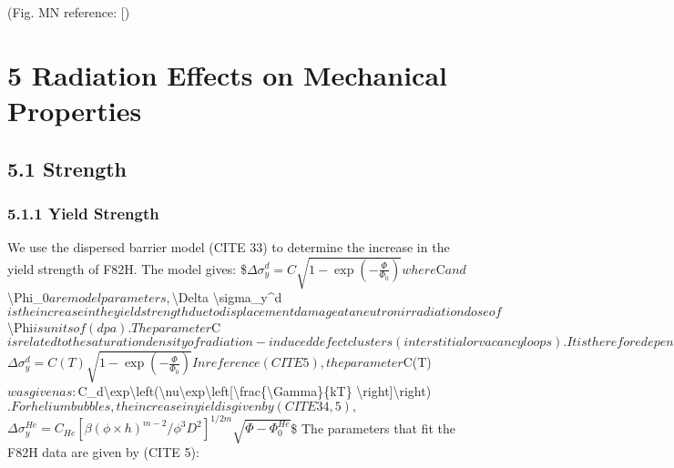 \documentclass[letterpaper,10pt,english]{jupyterBook}
\begin{document}
	\sphinxAtStartPar
	(Fig. M\sphinxhyphen{}N reference: {[}\sphinxhref{https://drive.google.com/file/d/17PwGHGcGPXCPxsERCxuVjBaVhB5xs8ud/view?usp=drive\_link}{Ando2009}{]})
	
	\sphinxstepscope
	
	
	\chapter{5 Radiation Effects on Mechanical Properties}
	\label{\detokenize{5 Radiation Effects on Mechanical Properties:radiation-effects-on-mechanical-properties}}\label{\detokenize{5 Radiation Effects on Mechanical Properties::doc}}
	
	\section{5.1 Strength}
	\label{\detokenize{5 Radiation Effects on Mechanical Properties:strength}}
	
	\subsection{5.1.1 Yield Strength}
	\label{\detokenize{5 Radiation Effects on Mechanical Properties:yield-strength}}
	\sphinxAtStartPar
	We use the dispersed barrier model (CITE 33) to determine the increase in the yield strength of F82H. The model gives:
	\$\( \Delta\sigma_y^d=C\sqrt{1-\exp(-\frac{\Phi}{\Phi_0})} \)\(
	where \)C\( and \)\textbackslash{}Phi\_0\( are model parameters, \)\textbackslash{}Delta \textbackslash{}sigma\_y\textasciicircum{}d\( is the increase in the yield strength due to displacement damage at a neutron irradiation dose of \)\textbackslash{}Phi\( is units of (dpa). The parameter \)C\( is related to the saturation density of radiation-induced defect clusters (interstitial or vacancy loops). It is therefore dependent on the temperature through the temperature dependence of the defect density.  Thus, a temperature-dependent version of the Makin-Minter model is:
	\)\( \Delta\sigma_y^d=C(T)\sqrt{1-\exp(-\frac{\Phi}{\Phi_0})} \)\(
	In reference (CITE 5), the parameter \)C(T)\( was given as: \)C\_d\textbackslash{}exp\textbackslash{}left(\sphinxhyphen{}\textbackslash{}nu\textbackslash{}exp\textbackslash{}left{[}\sphinxhyphen{}\textbackslash{}frac\{\textbackslash{}Gamma\}\{kT\} \textbackslash{}right{]}\textbackslash{}right)\(. For helium bubbles, the increase in yield is given by (CITE 34, 5),
	\)\( \Delta \sigma_y^{He}=C_{He}\left[\beta(\phi\times h)^{m-2}/\phi^3D^2\right]^{1/2m}\sqrt{\Phi-\Phi_0^{He}} \)\$
	The parameters that fit the F82H data are given by (CITE 5):
	
\end{document}
